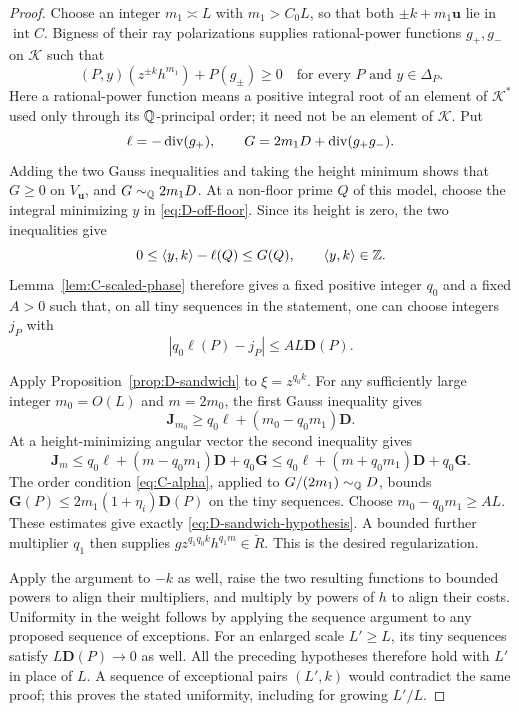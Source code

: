 \begin{proof}
Choose an integer $m_1\asymp L$ with $m_1>C_0L$, so that both
$\pm k+m_1\mathbf u$ lie in $\operatorname{int}C$.  Bigness of their
ray polarizations supplies rational-power functions $g_+,g_-$ on
$\mathcal K$ such that
\[
 (P,y)(z^{\pm k}h^{m_1})+P(g_\pm)\ge0
 \quad\text{for every }P\text{ and }y\in\Delta_P.
\]
Here a rational-power function means a positive integral root of an
element of $\mathcal K^*$ used only through its $\mathbb Q$-principal order;
it need not be an element of $\mathcal K$.  Put
\[
 \ell=-\operatorname{div}(g_+),\qquad
 G=2m_1D+\operatorname{div}(g_+g_-).
\]
Adding the two Gauss inequalities and taking the height minimum shows
that $G\ge0$ on $V_{\mathbf u}$, and
$G\sim_{\mathbb Q}2m_1D$.  At a non-floor prime $Q$ of this model, choose the
integral minimizing $y$ in \eqref{eq:D-off-floor}.  Since its height is
zero, the two inequalities give
\[
 0\le\langle y,k\rangle-\ell(Q)\le G(Q),
 \qquad \langle y,k\rangle\in\mathbb Z.
\]
Lemma~\ref{lem:C-scaled-phase} therefore gives a fixed positive integer
$q_0$ and a fixed $A>0$ such that, on all tiny sequences in the
statement, one can choose integers $j_P$ with
\[
 |q_0\ell(P)-j_P|\le A L\mathbf D(P).
\]

Apply Proposition~\ref{prop:D-sandwich} to $\xi=z^{q_0k}$.
For any sufficiently large integer $m_0=O(L)$ and $m=2m_0$, the first
Gauss inequality gives
\[
 \mathbf J_{m_0}\ge q_0\ell+(m_0-q_0m_1)\mathbf D.
\]
At a height-minimizing angular vector the second inequality gives
\[
 \mathbf J_m\le q_0\ell+(m-q_0m_1)\mathbf D+q_0\mathbf G
 \le q_0\ell+(m+q_0m_1)\mathbf D+q_0\mathbf G.
\]
The order condition \eqref{eq:C-alpha}, applied to
$G/(2m_1)\sim_{\mathbb Q}D$, bounds
$\mathbf G(P)\le2m_1(1+\eta_i)\mathbf D(P)$ on the tiny sequences.
Choose $m_0-q_0m_1\ge AL$.  These estimates give exactly
\eqref{eq:D-sandwich-hypothesis}.  A bounded further multiplier $q_1$
then supplies $g z^{q_1q_0k}h^{q_1m}\in\breve R$.  This is the desired
regularization.

Apply the argument to $-k$ as well, raise the two resulting functions
to bounded powers to align their multipliers, and multiply by powers of
$h$ to align their costs.  Uniformity in the weight follows by applying
the sequence argument to any proposed sequence of exceptions.  For an
enlarged scale $L'\ge L$, its tiny sequences satisfy
$L\mathbf D(P)\to0$ as well.  All the preceding hypotheses therefore
hold with $L'$ in place of $L$.  A sequence of exceptional pairs
$(L',k)$ would contradict the same proof; this proves the stated
uniformity, including for growing $L'/L$.
\end{proof}

